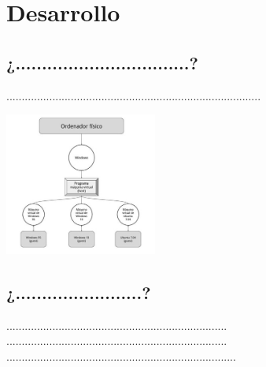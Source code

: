 \documentclass[twoside,twocolumn]{article}
\begin{document}

\section{Desarrollo}

\subsection{¿.................................?}

...................................................................................

\begin{center}
	\includegraphics[width=5cm]{./Imagenes/virtualizacion} 
	\end{center}




\subsection{¿........................?}

........................................................................\\
........................................................................\\
...........................................................................
\end{document}

